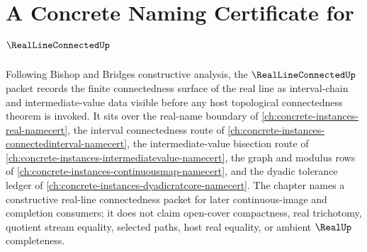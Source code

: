 \chapter{A Concrete Naming Certificate for $\RealLineConnectedUp$}
\label{ch:concrete-instances-real-line-connected-namecert}

Following Bishop and Bridges constructive analysis, the $\RealLineConnectedUp$ packet records the finite connectedness surface of the real line as interval-chain and intermediate-value data visible before any host topological connectedness theorem is invoked. It sits over the real-name boundary of \autoref{ch:concrete-instances-real-namecert}, the interval connectedness route of \autoref{ch:concrete-instances-connectedinterval-namecert}, the intermediate-value bisection route of \autoref{ch:concrete-instances-intermediatevalue-namecert}, the graph and modulus rows of \autoref{ch:concrete-instances-continuousmap-namecert}, and the dyadic tolerance ledger of \autoref{ch:concrete-instances-dyadicratcore-namecert}. The chapter names a constructive real-line connectedness packet for later continuous-image and completion consumers; it does not claim open-cover compactness, real trichotomy, quotient stream equality, selected paths, host real equality, or ambient $\RealUp$ completeness.

